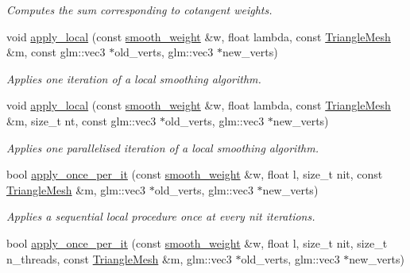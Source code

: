 \begin{DoxyCompactItemize}
\begin{DoxyCompactList}\small\item\em Computes the sum corresponding to cotangent weights. \end{DoxyCompactList}\item 
void \hyperlink{namespacegeoproc_1_1smoothing_1_1local__private_a39385a162edb351605f8d4e304bea74f}{apply\+\_\+local} (const \hyperlink{namespacegeoproc_1_1smoothing_a76e43f405426c150569712512de58028}{smooth\+\_\+weight} \&w, float lambda, const \hyperlink{classgeoproc_1_1TriangleMesh}{Triangle\+Mesh} \&m, const glm\+::vec3 $\ast$old\+\_\+verts, glm\+::vec3 $\ast$new\+\_\+verts)
\begin{DoxyCompactList}\small\item\em Applies one iteration of a local smoothing algorithm. \end{DoxyCompactList}\item 
void \hyperlink{namespacegeoproc_1_1smoothing_1_1local__private_a98b54c822111def6ba4bf638982a3251}{apply\+\_\+local} (const \hyperlink{namespacegeoproc_1_1smoothing_a76e43f405426c150569712512de58028}{smooth\+\_\+weight} \&w, float lambda, const \hyperlink{classgeoproc_1_1TriangleMesh}{Triangle\+Mesh} \&m, size\+\_\+t nt, const glm\+::vec3 $\ast$old\+\_\+verts, glm\+::vec3 $\ast$new\+\_\+verts)
\begin{DoxyCompactList}\small\item\em Applies one parallelised iteration of a local smoothing algorithm. \end{DoxyCompactList}\item 
bool \hyperlink{namespacegeoproc_1_1smoothing_1_1local__private_ad81d48e40cfb5d71780dbe2edf00293e}{apply\+\_\+once\+\_\+per\+\_\+it} (const \hyperlink{namespacegeoproc_1_1smoothing_a76e43f405426c150569712512de58028}{smooth\+\_\+weight} \&w, float l, size\+\_\+t nit, const \hyperlink{classgeoproc_1_1TriangleMesh}{Triangle\+Mesh} \&m, glm\+::vec3 $\ast$old\+\_\+verts, glm\+::vec3 $\ast$new\+\_\+verts)
\begin{DoxyCompactList}\small\item\em Applies a sequential local procedure once at every {\itshape nit} iterations. \end{DoxyCompactList}\item 
bool \hyperlink{namespacegeoproc_1_1smoothing_1_1local__private_a2d7306fe54658da961be68693a7cd97c}{apply\+\_\+once\+\_\+per\+\_\+it} (const \hyperlink{namespacegeoproc_1_1smoothing_a76e43f405426c150569712512de58028}{smooth\+\_\+weight} \&w, float l, size\+\_\+t nit, size\+\_\+t n\+\_\+threads, const \hyperlink{classgeoproc_1_1TriangleMesh}{Triangle\+Mesh} \&m, glm\+::vec3 $\ast$old\+\_\+verts, glm\+::vec3 $\ast$new\+\_\+verts)

\end{DoxyCompactItemize}
